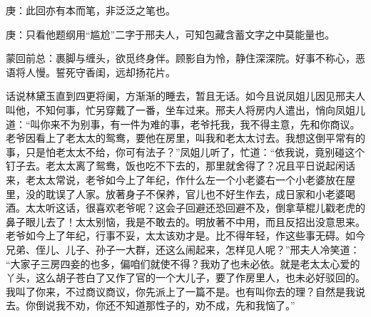 

\begin{parag}
    \begin{note}庚：此回亦有本而笔，非泛泛之笔也。\end{note}
\end{parag}


\begin{parag}
    \begin{note}庚：只看他题纲用“尴尬”二字于邢夫人，可知包藏含蓄文字之中莫能量也。\end{note}
\end{parag}


\begin{parag}
    \begin{note}蒙回前总：裹脚与缠头，欲觅终身伴。顾影自为怜，静住深深院。好事不称心，恶语将人慢。誓死守香闺，远却扬花片。\end{note}
\end{parag}


\begin{parag}
    话说林黛玉直到四更将阑，方渐渐的睡去，暂且无话。如今且说凤姐儿因见邢夫人叫他，不知何事，忙另穿戴了一番，坐车过来。邢夫人将房内人遣出，悄向凤姐儿道：“叫你来不为别事，有一件为难的事，老爷托我，我不得主意，先和你商议。老爷因看上了老太太的鸳鸯，要他在房里，叫我和老太太讨去。我想这倒平常有的事，只是怕老太太不给，你可有法子？”凤姐儿听了，忙道：“依我说，竟别碰这个钉子去。老太太离了鸳鸯，饭也吃不下去的，那里就舍得了？况且平日说起闲话来，老太太常说，老爷如今上了年纪，作什么左一个小老婆右一个小老婆放在屋里，没的耽误了人家。放著身子不保养，官儿也不好生作去，成日家和小老婆喝酒。太太听这话，很喜欢老爷呢？这会子回避还恐回避不及，倒拿草棍儿戳老虎的鼻子眼儿去了！太太别恼，我是不敢去的。明放著不中用，而且反招出没意思来。老爷如今上了年纪，行事不妥，太太该劝才是。比不得年轻，作这些事无碍。如今兄弟、侄儿、儿子、孙子一大群，还这么闹起来，怎样见人呢？”邢夫人冷笑道： “大家子三房四妾的也多，偏咱们就使不得？我劝了也未必依。就是老太太心爱的丫头，这么胡子苍白了又作了官的一个大儿子，要了作房里人，也未必好驳回的。我叫了你来，不过商议商议，你先派上了一篇不是。也有叫你去的理？自然是我说去。你倒说我不劝，你还不知道那性子的，劝不成，先和我恼了。”
\end{parag}


